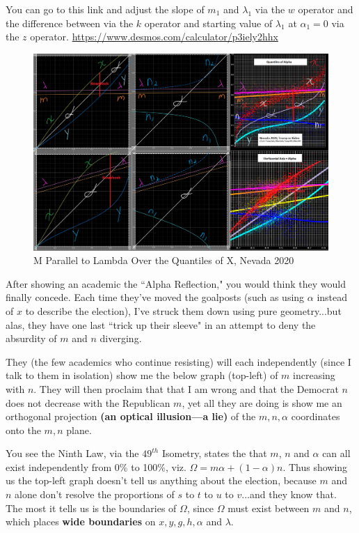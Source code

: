 \documentclass[preprint,13pt]{elsarticle}
\begin{document}
You can go to this link and adjust the slope of $m_{1}$ and $\lambda_{1}$ via the $w$ operator and the difference between via the $k$ operator and starting value of $\lambda_{1}$ at $\alpha_{1}=0$ via the $z$ operator.
\url{https://www.desmos.com/calculator/p3iely2hhx}
\begin{figure}[bp!]
\begin{center}
\caption{M Parallel to Lambda Over the Quantiles of X, Nevada 2020}
\includegraphics[width=400pt]{Alpha Reflection Theorem, Nevada 2020.png}
\end{center}
\end{figure}
\newpage
After showing an academic the ``Alpha Reflection," you would think they would finally concede. Each time they've moved the goalposts (such as using $\alpha$ instead of $x$ to describe the election), I've struck them down using pure geometry...but alas, they have one last ``trick up their sleeve" in an attempt to deny the absurdity of $m$ and $n$ diverging.

They (the few academics who continue resisting) will each independently (since I talk to them in isolation) show me the below graph (top-left) of $m$ increasing with $n$. They will then proclaim that that I am wrong and that the Democrat $n$ does not decrease with the Republican $m$, yet all they are doing is show me an orthogonal projection \textbf{(an optical illusion---a lie)} of the $m,n,\alpha$ coordinates onto the $m,n$ plane.

You see the Ninth Law, via the $49^{th}$ Isometry, states the that $m$, $n$ and $\alpha$ can all exist independently from 0\% to 100\%, viz. $\Omega=m\alpha+(1-\alpha)n$. Thus showing us the top-left graph doesn't tell us anything about the election, because $m$ and $n$ alone don't resolve the proportions of $s$ to $t$ to $u$ to $v$...and they know that. The most it tells us is the boundaries of $\Omega$, since $\Omega$ must exist between $m$ and $n$, which places \textbf{wide boundaries} on $x,y,g,h,\alpha$ and $\lambda$.
\end{document}
